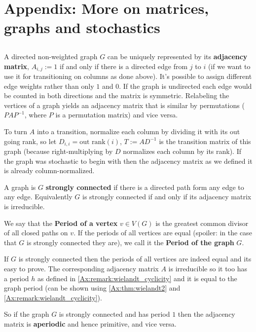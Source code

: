 \section{Appendix: More on matrices, graphs and stochastics}
\subsection*{}

\subsection*{}

A directed non-weighted graph $G$ can be uniquely represented by its
\textbf{adjacency matrix},
$A_{i,j} := 1$ if and only if there is a directed edge from $j$ to $i$ (if we
want to use it for transitioning on columns as done above). It's possible to
assign different edge weights rather than only $1$ and $0$. If the graph is
undirected each edge would be counted in both directions and the matrix is
symmetric.
Relabeling the vertices of a graph yields an adjacency matrix that is similar by
permutations ($PAP^{-1}$, where $P$ is a permutation matrix) and vice versa.

To turn $A$ into a transition, normalize each column by dividing it with
its out going rank, so let $D_{i,i} = \text{out~rank}(i)$, $T:=AD^{-1}$ is the
transition matrix of this graph (because right-multiplying by $D$ normalizes each
column by its rank).
If the graph was stochastic to begin with then the adjacency matrix as we
defined it is already column-normalized.

\begin{mydef}
\label{Ax:def:stronglyconnected}
A graph is $G$ \textbf{strongly connected} if there is a directed path form any edge
to any edge. Equivalently $G$ is strongly connected if and only if its adjacency matrix is irreducible.

We say that the \textbf{Period of a vertex} $v \in V(G)$ is the greatest common
divisor of all closed paths on $v$. If the periods of all vertices are equal
(spoiler: in the case that $G$ is strongly connected they are), we call it the
\textbf{Period of the graph} $G$.
\end{mydef}

\begin{remark}
\label{Ax:remark:periods}
If $G$ is strongly connected then the periods of all vertices are indeed equal
and its easy to prove. The corresponding adjacency matrix $A$ is irreducible so
it too has a period $h$ as defined in \ref{Ax:remark:wielandt_cyclicity} and it is
equal to the graph period (can be shown using \ref{Ax:thm:wielandt2} and
\ref{Ax:remark:wielandt_cyclicity}).

So if the graph $G$ is strongly connected and has period $1$
then the adjacency matrix is \textbf{aperiodic} and hence primitive, and vice versa. 
\end{remark}

